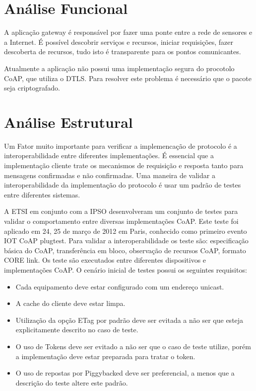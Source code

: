 \section{An\'alise Funcional}

A aplica\c{c}\~ao gateway \'e respons\'avel por fazer uma ponte entre a rede de sensores e a Internet. \'E poss\'ivel descobrir servi\c{c}os e recursos, iniciar requisi\c{c}\~oes, fazer descoberta de recursos, tudo  isto \'e transparente para os pontos comunicantes.

Atualmente a aplica\c{c}\~ao n\~ao possui uma implementa\c{c}\~ao segura do procotolo CoAP, que utiliza o DTLS. Para resolver este problema \'e necess\'ario que o pacote seja criptografado.

\section{An\'alise Estrutural}

Um Fator muito importante para verificar a implemenca\c{c}\~ao de protocolo \'e a interoperabilidade entre diferentes implementa\c{c}\~oes. \'E essencial que a implementa\c{c}\~ao cliente trate os mecanismos de requisi\c{c}\~ao e resposta tanto para mensagens confirmadas e n\~ao confirmadas. Uma maneira de validar a interoperabilidade da implementa\c{c}\~ao do protocolo \'e usar um padr\~ao de testes entre diferentes sistemas.

A ETSI em conjunto com a IPSO desenvolveram um conjunto de testes para validar o comportamento entre diversas implementa\c{c}\~oes CoAP. Este teste foi aplicado em 24, 25 de mar\c{c}o de 2012 em Paris, conhecido como primeiro evento IOT CoAP plugtest. Para validar a interoperabilidade os teste s\~ao: especifica\c{c}\~ao b\'asica do CoAP, transfer\^encia em bloco, observa\c{c}\~ao de recursos CoAP, formato CORE link. Os teste s\~ao executados entre diferentes dispositivos e implementa\c{c}\~oes CoAP. O cen\'ario inicial de testes possui os seguintes requisitos:
\begin{itemize}
    \item Cada equipamento deve estar configurado com um endere\c{c}o unicast.
    \item A cache do cliente deve estar limpa.
    \item Utiliza\c{c}\~ao da op\c{c}\~ao ETag por padr\~ao deve ser evitada a n\~ao ser que esteja explicitamente descrito no caso de teste. 
    \item O uso de Tokens deve ser evitado a n\~ao ser que o caso de teste utilize, por\'em a implementa\c{c}\~ao deve estar preparada para tratar o token.
    \item O uso de repostas por Piggybacked deve ser preferencial, a menos que a descri\c{c}\~ao do teste altere este padr\~ao.
\end{itemize}

